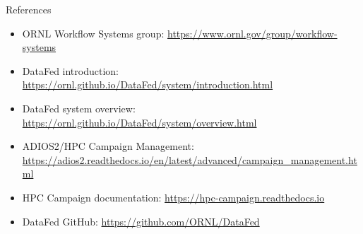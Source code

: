 \documentclass[aspectratio=169,11pt]{beamer}
\begin{document}
\begin{frame}{References}
  \small
  \begin{itemize}
    \item ORNL Workflow Systems group:
      \url{https://www.ornl.gov/group/workflow-systems}
    \item DataFed introduction:
      \url{https://ornl.github.io/DataFed/system/introduction.html}
    \item DataFed system overview:
      \url{https://ornl.github.io/DataFed/system/overview.html}
    \item ADIOS2/HPC Campaign Management:
      \url{https://adios2.readthedocs.io/en/latest/advanced/campaign_management.html}
    \item HPC Campaign documentation:
      \url{https://hpc-campaign.readthedocs.io}
    \item DataFed GitHub:
      \url{https://github.com/ORNL/DataFed}
  \end{itemize}
\end{frame}
\end{document}
